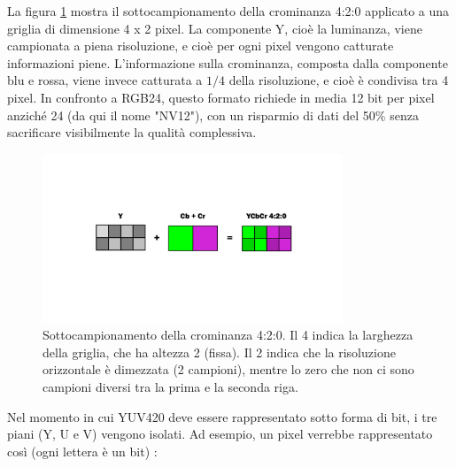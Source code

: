 
La figura \ref{fig:diff_yuv420} mostra il sottocampionamento della crominanza 4:2:0 applicato a una griglia di dimensione 4 x 2 pixel. La componente Y, cioè la luminanza, viene campionata a piena risoluzione, e cioè per ogni pixel vengono catturate informazioni piene. L'informazione sulla crominanza, composta dalla componente blu e rossa\footnotemark{}, viene invece catturata a $1/4$ della risoluzione, e cioè è condivisa tra 4 pixel. In confronto a RGB24, questo formato richiede in media 12 bit per pixel anziché 24 (da qui il nome "NV12"), con un risparmio di dati del 50\% senza sacrificare visibilmente la qualità complessiva.


\begin{figure}[htbp]
	\centering
	
	\includegraphics[width=0.8\textwidth]{res/yuv420.pdf}
	
	\caption{Sottocampionamento della crominanza 4:2:0. Il 4 indica la larghezza della griglia, che ha altezza 2 (fissa). Il 2 indica che la risoluzione orizzontale è dimezzata (2 campioni), mentre lo zero che non ci sono campioni diversi tra la prima e la seconda riga.}
	\label{fig:diff_yuv420}
\end{figure}

Nel momento in cui YUV420 deve essere rappresentato sotto forma di bit, i tre piani (Y, U e V) vengono isolati. Ad esempio, un pixel verrebbe rappresentato così (ogni lettera è un bit) \cite{vlc}:


